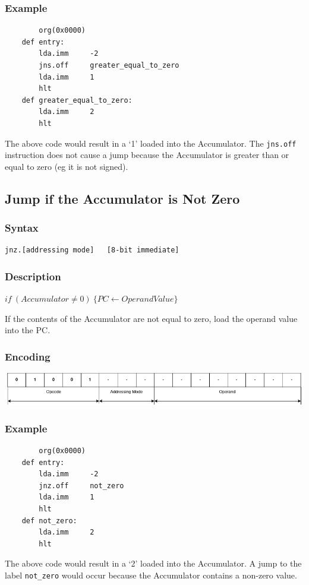     \subsubsection{Example}
    \begin{verbatim}
        org(0x0000)
    def entry:
        lda.imm     -2
        jns.off     greater_equal_to_zero
        lda.imm     1
        hlt
    def greater_equal_to_zero:
        lda.imm     2
        hlt
    \end{verbatim}
    \par The above code would result in a `1' loaded into the Accumulator.
    The \texttt{jns.off} instruction does not cause a jump because the Accumulator
    is greater than or equal to zero (eg it is not signed).

\pagebreak
\subsection{Jump if the Accumulator is Not Zero}\label{subsec:jnz}
    \subsubsection{Syntax}
    \begin{verbatim}jnz.[addressing mode]   [8-bit immediate]\end{verbatim}
    \subsubsection{Description}
    $if\ (Accumulator \neq 0)\ \{ PC \leftarrow OperandValue \}$
    \par If the contents of the Accumulator are not equal to zero, load the operand value into the PC\@.
    \subsubsection{Encoding}
    \begin{center}
        \includegraphics[scale=0.40]{img/Andromeda-JNZ.drawio}
    \end{center}

    \subsubsection{Example}
    \begin{verbatim}
        org(0x0000)
    def entry:
        lda.imm     -2
        jnz.off     not_zero
        lda.imm     1
        hlt
    def not_zero:
        lda.imm     2
        hlt
    \end{verbatim}
    The above code would result in a `2' loaded into the Accumulator.
    A jump to the label \texttt{not\_zero} would occur because the Accumulator
    contains a non-zero value.

